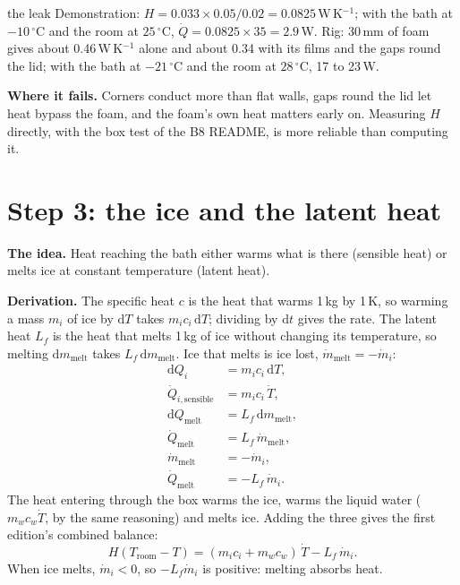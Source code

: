 \documentclass[11pt,a4paper]{article}
\newcommand{\dd}{\mathrm{d}}
\newcommand{\dC}{\,{}^{\circ}\mathrm{C}}
\newcommand{\Troom}{T_{\mathrm{room}}}
\newcommand{\para}[1]{\par\smallskip\noindent\textbf{#1}\enspace}
\begin{document}
\begin{worked}{the leak}
Demonstration: $H = 0.033\times0.05/0.02 = 0.0825$\,W\,K$^{-1}$; with the bath at $-10\dC$ and the room at
$25\dC$, $\dot Q = 0.0825\times35 = 2.9$\,W. Rig: 30\,mm of foam gives about 0.46\,W\,K$^{-1}$ alone and about
0.34 with its films and the gaps round the lid; with the bath at $-21\dC$ and the room at $28\dC$, 17 to
23\,W.
\end{worked}

\para{Where it fails.} Corners conduct more than flat walls, gaps round the lid let heat bypass the foam,
and the foam's own heat matters early on. Measuring $H$ directly, with the box test of the B8 README, is
more reliable than computing it.

\section{Step 3: the ice and the latent heat}\label{sec:s3}

\para{The idea.} Heat reaching the bath either warms what is there (sensible heat) or melts ice at constant
temperature (latent heat).

\para{Derivation.} The specific heat $c$ is the heat that warms 1\,kg by 1\,K, so warming a mass $m_i$ of
ice by $\dd T$ takes $m_ic_i\,\dd T$; dividing by $\dd t$ gives the rate. The latent heat $L_f$ is the heat
that melts 1\,kg of ice without changing its temperature, so melting $\dd m_{\mathrm{melt}}$ takes
$L_f\,\dd m_{\mathrm{melt}}$. Ice that melts is ice lost, $\dot m_{\mathrm{melt}} = -\dot m_i$:
\begin{align}
\dd Q_i &= m_ic_i\,\dd T, \label{eq:s3-dQi}\\
\dot Q_{i,\mathrm{sensible}} &= m_ic_i\,\dot T, \label{eq:s3-Qi}\\
\dd Q_{\mathrm{melt}} &= L_f\,\dd m_{\mathrm{melt}}, \label{eq:s3-dQm}\\
\dot Q_{\mathrm{melt}} &= L_f\,\dot m_{\mathrm{melt}}, \label{eq:s3-Qm}\\
\dot m_{\mathrm{melt}} &= -\dot m_i, \label{eq:s3-mm}\\
\dot Q_{\mathrm{melt}} &= -L_f\,\dot m_i. \label{eq:s3-Qm2}
\end{align}
The heat entering through the box warms the ice, warms the liquid water ($m_wc_w\dot T$, by the same
reasoning) and melts ice. Adding the three gives the first edition's combined balance:
\begin{equation}
H(\Troom - T) = (m_ic_i + m_wc_w)\,\dot T - L_f\,\dot m_i . \label{eq:s3-balance}
\end{equation}
When ice melts, $\dot m_i < 0$, so $-L_f\dot m_i$ is positive: melting absorbs heat.
\end{document}
